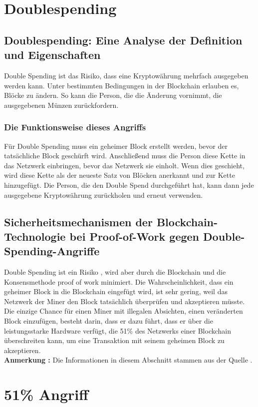 \section{Doublespending}
\subsection{Doublespending: Eine Analyse der Definition und Eigenschaften}\label{blockchain:doublespending}
Double Spending ist das Risiko, dass eine Kryptowährung mehrfach ausgegeben werden kann. Unter bestimmten Bedingungen in der Blockchain erlauben es, Blöcke zu ändern. So kann die Person, die die Änderung vornimmt, die ausgegebenen Münzen zurückfordern.
\subsubsection{Die Funktionsweise dieses Angriffs}
Für Double Spending muss ein geheimer Block erstellt werden, bevor der tatsächliche Block geschürft wird. Anschließend muss die Person diese Kette in das Netzwerk einbringen, bevor das Netzwerk sie einholt. Wenn dies geschieht, wird diese Kette als der neueste Satz von Blöcken anerkannt und zur Kette hinzugefügt. Die Person, die den Double Spend durchgeführt hat, kann dann jede ausgegebene Kryptowährung zurückholen und erneut verwenden.
\subsection{Sicherheitsmechanismen der Blockchain-Technologie bei Proof-of-Work gegen Double-Spending-Angriffe}
Double Spending ist ein Risiko , wird aber durch die Blockchain und die Konsensmethode proof of work minimiert. Die Wahrscheinlichkeit, dass ein geheimer Block in die Blockchain eingefügt wird, ist sehr gering, weil das Netzwerk der Miner den Block tatsächlich überprüfen und akzeptieren müsste. Die einzige Chance für einen Miner mit illegalen Absichten, einen veränderten Block einzufügen, besteht darin, dass er dazu führt, dass er über die leistungsstarke Hardware verfügt, die 51\% des Netzwerks einer Blockchain überschreiten kann, um eine Transaktion mit seinem geheimen Block zu akzeptieren. \\
\textbf{Anmerkung : } Die Informationen in diesem Abschnitt stammen aus der Quelle \cite{double_spending_attack}.

\section{51\% Angriff}
